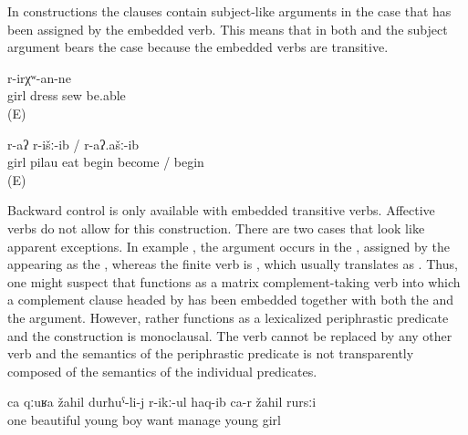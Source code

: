 In  constructions the clauses contain subject-like arguments in the  case that has been assigned by the embedded verb. This means that in both  and  the subject argument bears the  case because the embedded verbs are transitive.
%
\begin{exe}
	\ex	\label{ex:‎The girl will be able to sew the dress}
		r-irχʷ-an-ne\\
		girl	dress	sew	be.able\\
	\glt	{} (E)

	\ex	\label{ex:‎The girl began to eat the pilau}
		r-aʔ	r-išː-ib	/	r-aʔ.ašː-ib\\
		girl pilau	eat \tsc{f-}begin	become	/ begin\\
	\glt	{} (E)
\end{exe}

Backward control is only available with embedded transitive verbs. Affective verbs do not allow for this construction. There are two cases that look like apparent exceptions. In example , the  argument occurs in the , assigned by the    appearing as the , whereas the finite verb is , which usually translates as . Thus, one might suspect that  functions as a matrix complement-taking verb into which a complement clause headed by  has been embedded together with both the  and the  argument. However,  rather functions as a lexicalized periphrastic predicate and the construction is monoclausal. The verb  cannot be replaced by any other verb and the semantics of the periphrastic predicate is not transparently composed of the semantics of the individual predicates.
%
\begin{exe}
	\ex	\label{ex:‎One beautiful young man fell in love with a young girl}
	\gll	ca	qːuʁa	žahil	durħuˁ-li-j	r-ikː-ul	haq-ib	ca-r	žahil	rursːi\\
		one	beautiful	young	boy	want	manage		young	girl\\
	\glt	{} 
\end{exe}

